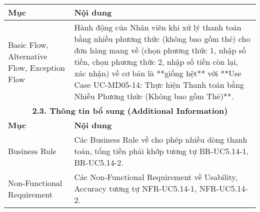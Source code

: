 \begin{longtable}{|m{4cm}|p{11cm}|}
\hline
\textbf{Mục} & \textbf{Nội dung} \\
\hline
Basic Flow, Alternative Flow, Exception Flow & Hành động của Nhân viên khi xử lý thanh toán bằng nhiều phương thức (không bao gồm thẻ) cho đơn hàng mang về (chọn phương thức 1, nhập số tiền, chọn phương thức 2, nhập số tiền còn lại, xác nhận) về cơ bản là **giống hệt** với **Use Case UC-MD05-14: Thực hiện Thanh toán bằng Nhiều Phương thức (Không bao gồm Thẻ)**. \\
\hline
\multicolumn{2}{|c|}{\textbf{2.3. Thông tin bổ sung (Additional Information)}} \\
\hline
\textbf{Mục} & \textbf{Nội dung} \\
\hline
Business Rule & Các Business Rule về cho phép nhiều dòng thanh toán, tổng tiền phải khớp tương tự BR-UC5.14-1, BR-UC5.14-2. \\
\hline
Non-Functional Requirement & Các Non-Functional Requirement về Usability, Accuracy tương tự NFR-UC5.14-1, NFR-UC5.14-2. \\
\hline
\end{longtable}

